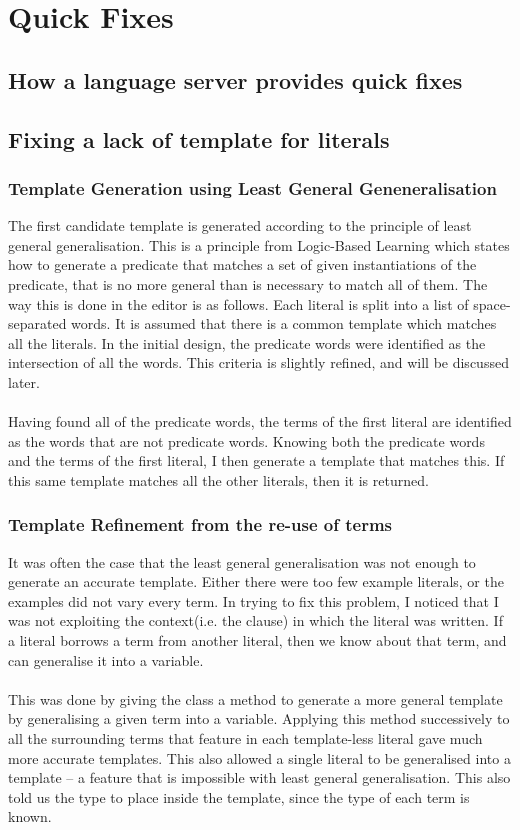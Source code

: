 \documentclass[../main.tex]{subfiles}
\begin{document}
\section{Quick Fixes}
\subsection{How a language server provides quick fixes}

\subsection{Fixing a lack of template for literals}
\subsubsection{Template Generation using Least General Geneneralisation}
The first candidate template is generated according to the principle of least general generalisation. This is a principle from Logic-Based Learning which states how to generate a predicate that matches a set of given instantiations of the predicate, that is no more general than is necessary to match all of them.
The way this is done in the editor is as follows. Each literal is split into a list of space-separated words. It is assumed that there is a common template which matches all the literals. In the initial design, the predicate words were identified as the intersection of all the words. This criteria is slightly refined, and will be discussed later.
\\ 
\\
Having found all of the predicate words, the terms of the first literal are identified as the words that are not predicate words. Knowing both the predicate words and the terms of the first literal, I then generate a template that matches this. If this same template matches all the other literals, then it is returned.

\subsubsection{Template Refinement from the re-use of terms}
It was often the case that the least general generalisation was not enough to generate an accurate template. Either there were too few example literals, or the examples did not vary every term. In trying to fix this problem, I noticed that I was not exploiting the context(i.e. the clause) in which the literal was written. If a literal borrows a term from another literal, then we know about that term, and can generalise it into a variable.
\\
\\
This was done by giving the  class a method to generate a more general template by generalising a given term into a variable. Applying this method successively to all the surrounding terms that feature in each template-less literal gave much more accurate templates. This also allowed a single literal to be generalised into a template -- a feature that is impossible with least general generalisation. This also told us the type to place inside the template, since the type of each term is known.
\end{document}
